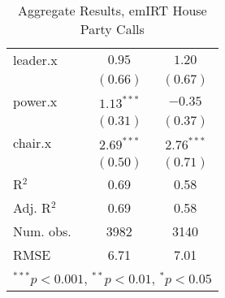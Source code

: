 \documentclass[12pt]{article}
\begin{document}
\begin{table}
\begin{center}
\begin{tabular}{l c c }
			leader.x                    & $0.95$        & $1.20$        \\
			& $(0.66)$      & $(0.67)$      \\
			power.x                     & $1.13^{***}$  & $-0.35$       \\
			& $(0.31)$      & $(0.37)$      \\
			chair.x                     & $2.69^{***}$  & $2.76^{***}$  \\
			& $(0.50)$      & $(0.71)$      \\
			\hline
			R$^2$                       & 0.69          & 0.58          \\
			Adj. R$^2$                  & 0.69          & 0.58          \\
			Num. obs.                   & 3982          & 3140          \\
			RMSE                        & 6.71          & 7.01          \\
			\hline
			\multicolumn{3}{l}{\scriptsize{$^{***}p<0.001$, $^{**}p<0.01$, $^*p<0.05$}}
		\end{tabular}
		\caption{Aggregate Results, emIRT House Party Calls}
	\end{center}
\end{table}
	
	
	
	
	
	
\end{document}
